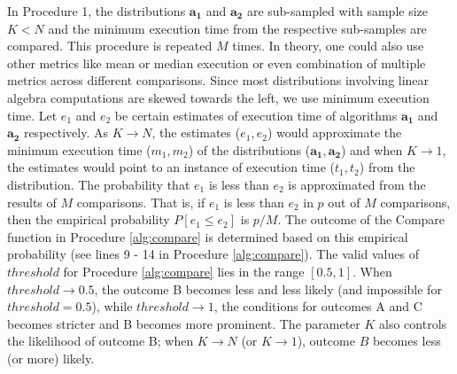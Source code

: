 \documentclass[conference]{IEEEtran}
\newcommand{\p}[1]{{\color{blue} Pdj: #1}}
\begin{document}
In Procedure 1, the distributions $\mathbf{a_1}$ and $\mathbf{a_2}$ are sub-sampled with sample size $K < N $ and the minimum
execution time from the respective sub-samples are compared. This procedure is repeated $M$ times. In theory, one could
also use other metrics like mean or median execution\cite{peise2019elaps} or even combination of multiple metrics across different
comparisons. Since most distributions involving linear algebra computations are skewed towards the left, we use minimum execution time\cite{peisethesis}\cite{robustbenchmarking}. Let $e_1$ and $e_2$ be certain estimates of execution time of algorithms $\mathbf{a_1}$ and $\mathbf{a_2}$ respectively. As $K \to N$, the estimates ($e_1, e_2$) would approximate the minimum execution time ($m_1, m_2$) of the distributions ($\mathbf{a_1}, \mathbf{a_2}$) and when $K \to 1$, the estimates would point to an instance of execution time ($t_1, t_2$) from the distribution.
The probability that $e_1$ is less than $e_2$ is approximated from the results of $M$ comparisons. That is, if $e_1$ is less than $e_2$ in $p$ out of $M$ comparisons, then the empirical probability $P[e_1 \le e_2]$ is $p/M$. 
%
The outcome of the Compare function in Procedure \ref{alg:compare} is determined based on this empirical probability (see lines 9 - 14 in Procedure \ref{alg:compare}).
The valid values of $threshold$ for Procedure \ref{alg:compare} lies in the range $[0.5,1]$. When $threshold \to 0.5$, the outcome B becomes
less and less likely (and impossible for $threshold=0.5$), while $threshold \to 1$, the conditions for outcomes A and C becomes stricter and B becomes more prominent. The parameter $K$ also controls the likelihood of outcome B; when $K \to N$ (or $K \to 1$), outcome $B$ becomes less (or more) likely. 
\end{document}
